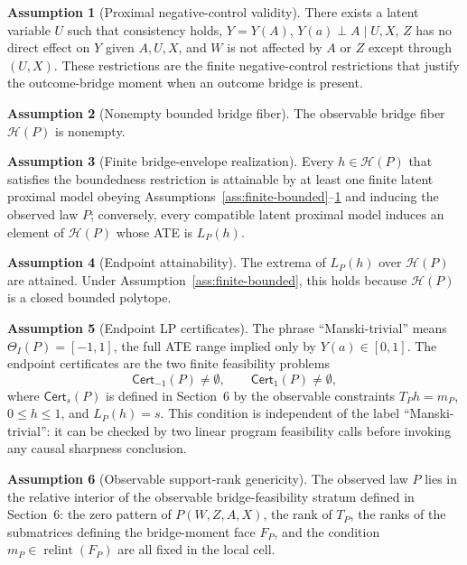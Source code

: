 \documentclass[11pt]{article}
\newcommand{\calH}{\mathcal{H}}
\theoremstyle{definition}
\newtheorem{assumption}{Assumption}
\theoremstyle{plain}
\theoremstyle{remark}
\begin{document}
\begin{assumption}[Proximal negative-control validity]\label{ass:proximal-valid}
There exists a latent variable \(U\) such that consistency holds,
\(Y=Y(A)\), \(Y(a)\perp A\mid U,X\), \(Z\) has no direct effect on \(Y\)
given \(A,U,X\), and \(W\) is not affected by \(A\) or \(Z\) except through
\((U,X)\).  These restrictions are the finite negative-control restrictions
that justify the outcome-bridge moment when an outcome bridge is present.
\end{assumption}

\begin{assumption}[Nonempty bounded bridge fiber]\label{ass:bridge-nonempty}
The observable bridge fiber \(\calH(P)\) is nonempty.
\end{assumption}

\begin{assumption}[Finite bridge-envelope realization]\label{ass:finite-realization}
Every \(h\in\calH(P)\) that satisfies the boundedness restriction is
attainable by at least one finite latent proximal model obeying
Assumptions~\ref{ass:finite-bounded}--\ref{ass:proximal-valid} and inducing
the observed law \(P\); conversely, every compatible latent proximal model
induces an element of \(\calH(P)\) whose ATE is \(L_P(h)\).
\end{assumption}

\begin{assumption}[Endpoint attainability]\label{ass:endpoint-attain}
The extrema of \(L_P(h)\) over \(\calH(P)\) are attained.  Under
Assumption~\ref{ass:finite-bounded}, this holds because \(\calH(P)\) is a
closed bounded polytope.
\end{assumption}

\begin{assumption}[Endpoint LP certificates]\label{ass:endpoint-certificates}
The phrase ``Manski-trivial'' means \(\Theta_I(P)=[-1,1]\), the full ATE
range implied only by \(Y(a)\in[0,1]\).  The endpoint certificates are the two
finite feasibility problems
\[
\mathsf{Cert}_{-1}(P)\neq\emptyset,\qquad
\mathsf{Cert}_{1}(P)\neq\emptyset,
\]
where \(\mathsf{Cert}_s(P)\) is defined in Section~6 by the observable
constraints \(T_Ph=m_P\), \(0\le h\le1\), and \(L_P(h)=s\).  This condition is
independent of the label ``Manski-trivial'': it can be checked by two linear
program feasibility calls before invoking any causal sharpness conclusion.
\end{assumption}

\begin{assumption}[Observable support-rank genericity]\label{ass:generic-stratum}
The observed law \(P\) lies in the relative interior of the observable
bridge-feasibility stratum defined in Section~6: the zero pattern of
\(P(W,Z,A,X)\), the rank of \(T_P\), the ranks of the submatrices defining
the bridge-moment face \(F_P\), and the condition
\(m_P\in\operatorname{relint}(F_P)\) are all fixed in the local cell.
\end{assumption}
\end{document}
